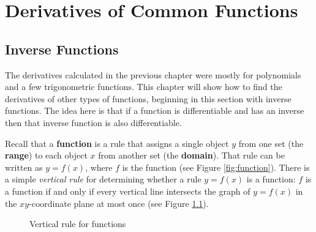 \chapter{Derivatives of Common Functions}\label{ch:derivatives-of-common-functions}
\section{Inverse Functions}
The derivatives calculated in the previous chapter were mostly for polynomials
and a few trigonometric functions. This chapter will show how to find the
derivatives of other types of functions, beginning in this section with inverse
functions. The idea here is that if a function is differentiable and has
an inverse then that inverse function is also differentiable.

\piccaption[]{\label{fig:function}}
Recall that a \textbf{function} is a rule that assigns a single
object $y$ from one set (the \textbf{range}) to each object $x$
from another set (the \textbf{domain}). That rule can be written
as $y = f(x)$, where $f$ is the function (see Figure \ref{fig:function}). There
is a simple \emph{vertical rule} for determining whether a rule $y=f(x)$ is a
function: $f$ is a function if and only if every vertical line intersects the
graph of $y=f(x)$ in the $xy$-coordinate plane at most once (see
Figure \ref{fig:verticalrule}).

\begin{figure}[h]
 \centering
 \qquad\qquad
 \vspace{-2mm}
 \caption[]{\quad Vertical rule for functions}
 \label{fig:verticalrule}
\end{figure}

